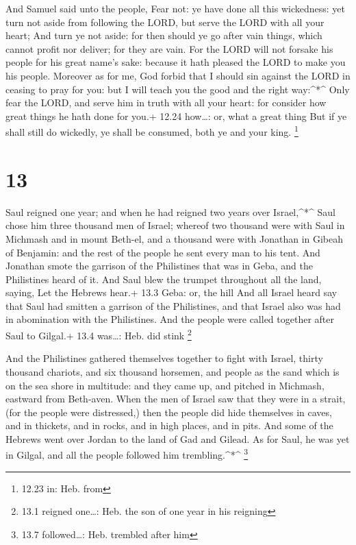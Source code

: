 And Samuel said unto the people, Fear not: ye have done
all this wickedness: yet turn not aside from following the LORD, but
serve the LORD with all your heart;  And turn ye not aside:
for then should ye go after vain things, which cannot profit nor
deliver; for they are vain.  For the LORD will not forsake
his people for his great name's sake: because it hath pleased the LORD
to make you his people.  Moreover as for me, God forbid
that I should sin against the LORD in ceasing to pray for you: but I
will teach you the good and the right way:\^{}*\^{}  Only
fear the LORD, and serve him in truth with all your heart: for consider
how great things he hath done for you.+ 12.24 how\ldots: or, what a
great thing  But if ye shall still do wickedly, ye shall be
consumed, both ye and your king. \footnote{12.23 in: Heb. from}

\hypertarget{section-12}{%
\section{13}\label{section-12}}

 Saul reigned one year; and when he had reigned two years
over Israel,\^{}*\^{}  Saul chose him three thousand men of
Israel; whereof two thousand were with Saul in Michmash and in mount
Beth-el, and a thousand were with Jonathan in Gibeah of Benjamin: and
the rest of the people he sent every man to his tent.  And
Jonathan smote the garrison of the Philistines that was in Geba, and the
Philistines heard of it. And Saul blew the trumpet throughout all the
land, saying, Let the Hebrews hear.+ 13.3 Geba: or, the hill
 And all Israel heard say that Saul had smitten a garrison
of the Philistines, and that Israel also was had in abomination with the
Philistines. And the people were called together after Saul to Gilgal.+
13.4 was\ldots: Heb. did stink \footnote{13.1 reigned one\ldots: Heb.
  the son of one year in his reigning}

 And the Philistines gathered themselves together to fight
with Israel, thirty thousand chariots, and six thousand horsemen, and
people as the sand which is on the sea shore in multitude: and they came
up, and pitched in Michmash, eastward from Beth-aven.  When
the men of Israel saw that they were in a strait, (for the people were
distressed,) then the people did hide themselves in caves, and in
thickets, and in rocks, and in high places, and in pits. 
And some of the Hebrews went over Jordan to the land of Gad and Gilead.
As for Saul, he was yet in Gilgal, and all the people followed him
trembling.\^{}*\^{} \footnote{13.7 followed\ldots: Heb. trembled after
  him}

